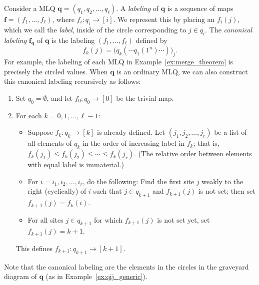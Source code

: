 \documentclass[reqno]{amsart}
\newcommand{\0}{\phantom{c}}
\newcommand{\ff}{\mathbf{f}}
\newcommand{\qq}{\mathbf{q}}
\newcommand{\tup}[1]{\left( #1 \right)}
\newcommand{\ive}[1]{\left[ #1 \right]}
\newcommand{\defn}[1]{{\color{darkred}\emph{#1}}} %
\theoremstyle{plain}
\theoremstyle{definition}
\numberwithin{equation}{section}
\begin{document}
Consider a MLQ $\qq = (q_1, q_2, \dotsc, q_{\ell})$.
A \defn{labeling} of $\qq$ is a sequence of maps $\ff = (f_1, \dotsc, f_{\ell})$, where $f_i \colon q_i \to \ive{i}$.
We represent this by placing an $f_i(j)$, which we call the \defn{label}, inside of the circle corresponding to $j \in q_i$.
The \defn{canonical labeling} $\ff_{\qq}$ of $\qq$ is the labeling $(f_1, \dotsc, f_{\ell})$ defined by
\begin{equation}
f_k(j) = \bigl( q_k( \cdots q_1(1^n) \cdots ) \bigr)_j.
\label{eq.AasLin-lab.formula}
\end{equation}
For example, the labeling of each MLQ in Example~\ref{ex:merge_theorem} is precisely the circled values.
When $\qq$ is an ordinary MLQ, we can also construct this canonical labeling recursively as follows:
\begin{enumerate}
\item Set $q_0 = \emptyset$, and let $f_0 : q_0 \to \ive{0}$ be the trivial map.
\item For each $k = 0, 1, \ldots, \ell-1$:
\begin{itemize}
\item Suppose $f_k \colon q_k \to \ive{k}$ is already defined. Let $\tup{j_1, j_2, \ldots, j_r}$ be a list of all elements of $q_k$ in the order of increasing label in $f_k$; that is, $f_k(j_1) \leq f_k(j_2) \leq \cdots \leq f_k(j_r)$.
      (The relative order between elements with equal label is immaterial.)
\item For $i = i_1, i_2, \ldots, i_r$, do the following:
      Find the first site $j$ weakly to the right (cyclically) of $i$ such that $j \in q_{k+1}$ and $f_{k+1}(j)$ is not set; then set $f_{k+1}(j) = f_k(i)$.
\item For all sites $j \in q_{k+1}$ for which $f_{k+1}(j)$ is not set yet, set $f_{k+1}(j) = k+1$.
\end{itemize}
This defines $f_{k+1} \colon q_{k+1} \to \ive{k+1}$.
\end{enumerate}
Note that the canonical labeling are the elements in the circles in the graveyard diagram of $\qq$ (as in Example~\ref{ex:qij_generic}).
\end{document}
